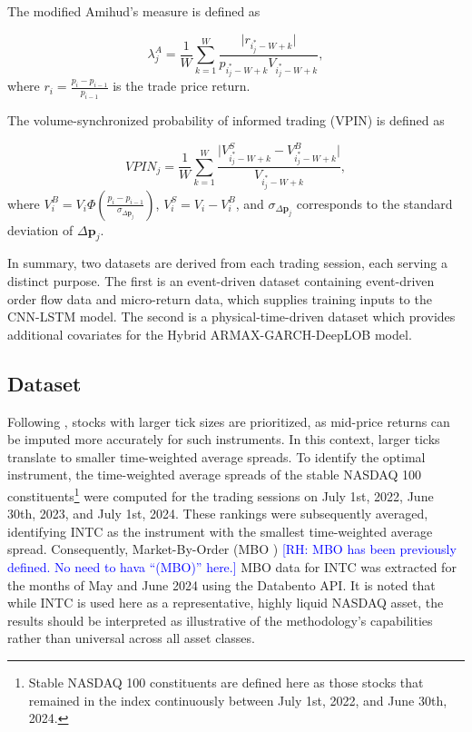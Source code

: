 \documentclass[10pt,a4paper,oneside]{article}
\newcommand{\rh}[1]{\textcolor{blue}{\textsf{[RH: #1]}}}
\providecommand{\DIFaddtex}[1]{{\protect\color{blue} \sf #1}} %
\providecommand{\DIFdeltex}[1]{{\protect\color{red} \scriptsize #1}} %
\providecommand{\DIFaddbegin}{} %
\providecommand{\DIFaddend}{} %
\providecommand{\DIFdelbegin}{} %
\providecommand{\DIFdelend}{} %
\providecommand{\DIFadd}[1]{\texorpdfstring{\DIFaddtex{#1}}{#1}} %
\providecommand{\DIFdel}[1]{\texorpdfstring{\DIFdeltex{#1}}{}} %
\newcommand{\DIFscaledelfig}{0.5}
\newlength{\DIFdelgraphicswidth} %
\newlength{\DIFdelgraphicsheight} %
\newcommand{\DIFaddincludegraphics}[2][]{{\color{blue}\fbox{\DIFOincludegraphics[#1]{#2}}}} %
\newcommand{\DIFdelincludegraphics}[2][]{%
\sbox{\DIFdelgraphicsbox}{\DIFOincludegraphics[#1]{#2}}%
\settoboxwidth{\DIFdelgraphicswidth}{\DIFdelgraphicsbox} %
\settoboxtotalheight{\DIFdelgraphicsheight}{\DIFdelgraphicsbox} %
\scalebox{\DIFscaledelfig}{%
\parbox[b]{\DIFdelgraphicswidth}{\usebox{\DIFdelgraphicsbox}\\[-\baselineskip] \rule{\DIFdelgraphicswidth}{0em}}\llap{\resizebox{\DIFdelgraphicswidth}{\DIFdelgraphicsheight}{%
\setlength{\unitlength}{\DIFdelgraphicswidth}%
\begin{picture}(1,1)%
\thicklines\linethickness{2pt} %
{\color[rgb]{1,0,0}\put(0,0){\framebox(1,1){}}}%
{\color[rgb]{1,0,0}\put(0,0){\line( 1,1){1}}}%
{\color[rgb]{1,0,0}\put(0,1){\line(1,-1){1}}}%
\end{picture}%
}\hspace*{3pt}}} %
} %
\DeclareRobustCommand{\DIFaddbegin}{\DIFOaddbegin \let\includegraphics\DIFaddincludegraphics} %
\DeclareRobustCommand{\DIFaddend}{\DIFOaddend \let\includegraphics\DIFOincludegraphics} %
\DeclareRobustCommand{\DIFdelbegin}{\DIFOdelbegin \let\includegraphics\DIFdelincludegraphics} %
\DeclareRobustCommand{\DIFdelend}{\DIFOaddend \let\includegraphics\DIFOincludegraphics} %
\begin{document}
The modified Amihud’s measure is defined as

\[
    \lambda^A_j = \frac{1}{W} \sum_{k=1}^W \frac{\big| r_{i^*_j - W + k} \big|}{p_{i^*_j - W + k} V_{i^*_j - W + k}},
\]
where \(r_i = \frac{p_i - p_{i-1}}{p_{i-1}}\) is the trade price return.

The volume-synchronized probability of informed trading (VPIN) is defined as

\[
    VPIN_j = \frac{1}{W} \sum_{k=1}^W \frac{\big| V_{i^*_j - W + k}^S - V_{i^*_j - W + k}^B \big|}{V_{i^*_j - W + k}},
\]
where \(V^B_i = V_i \Phi \left( \frac{p_i - p_{i-1}}{\sigma_{\Delta \mathbf{p}_j}} \right)\), \(V^S_i = V_i - V^B_i\), and \(\sigma_{\Delta \mathbf{p}_j}\) corresponds to the standard deviation of \(\Delta \mathbf{p}_j\).

In summary, two datasets are derived from each trading session, each serving a distinct purpose. The first is an event-driven dataset containing event-driven order flow data and micro-return data, which supplies training inputs to the CNN-LSTM model. The second is a physical-time-driven dataset which provides additional covariates for the Hybrid ARMAX-GARCH-DeepLOB model.

\subsection{Dataset}
\label{subsec:dataset}

Following \cite{briola2024deep}, stocks with larger tick sizes are prioritized, as mid-price returns can be imputed more accurately for such instruments. In this context, larger ticks translate to smaller time-weighted average spreads. To identify the optimal instrument, the time-weighted average spreads of the stable NASDAQ 100 constituents\footnote{Stable NASDAQ 100 constituents are defined here as those stocks that remained in the index continuously between July 1st, 2022, and June 30th, 2024.} were computed for the trading sessions on July 1st, 2022, June 30th, 2023, and July 1st, 2024. These rankings were subsequently averaged, identifying INTC as the instrument with the smallest time-weighted average spread. Consequently, \DIFdelbegin \DIFdel{Market-By-Order (MBO ) \rh{MBO has been previously defined. No need to hava ``(MBO)'' here.} }\DIFdelend \DIFaddbegin \DIFadd{MBO }\DIFaddend data for INTC was extracted for the months of May and June 2024 using the Databento API. It is noted that while INTC is used here as a representative, highly liquid NASDAQ asset, the results should be interpreted as illustrative of the methodology's capabilities rather than universal across all asset classes.
\end{document}
